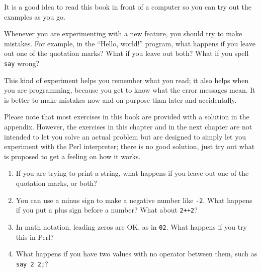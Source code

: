 \begin{exercise}

It is a good idea to read this book in front of a computer so you 
can try out the examples as you go.

Whenever you are experimenting with a new feature, you should try
to make mistakes.  For example, in the ``Hello, world!'' program,
what happens if you leave out one of the quotation marks?  What
if you leave out both?  What if you spell {\tt say} wrong?

This kind of experiment helps you remember what you read; it also
helps when you are programming, because you get to know what the error
messages mean.  It is better to make mistakes now and on purpose than
later and accidentally.

Please note that most exercises in this book are provided with 
a solution in the appendix. However, the exercises in this chapter   
and in the next chapter are not intended to let you solve an 
actual problem but are designed to simply let you experiment 
with the Perl interpreter; there is no good solution, just try 
out what is proposed to get a feeling on how it works.

\begin{enumerate}

\item If you are trying to print a string, what happens if you
leave out one of the quotation marks, or both?

\item You can use a minus sign to make a negative number like
{\tt -2}.  What happens if you put a plus sign before a number?
What about {\tt 2++2}?

\item In math notation, leading zeros are OK, as in {\tt 02}.
What happens if you try this in Perl?

\item What happens if you have two values with no operator
between them, such as {\tt say 2 2;}?

\end{enumerate}

\end{exercise}



